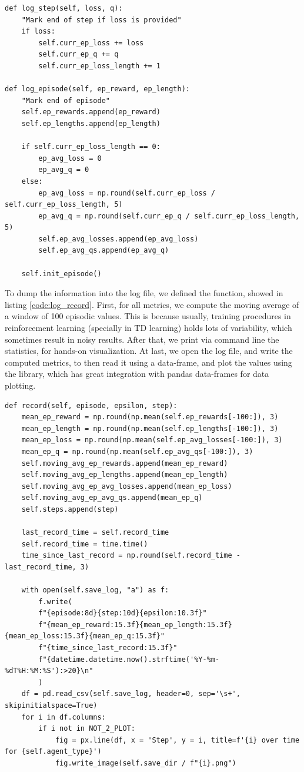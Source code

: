 \begin{lstlisting}[caption={Step and episode functions for metrics extraction}, label={code:log_step_ep}]
def log_step(self, loss, q):
	"Mark end of step if loss is provided"
	if loss:
		self.curr_ep_loss += loss
		self.curr_ep_q += q
		self.curr_ep_loss_length += 1
	
def log_episode(self, ep_reward, ep_length):
	"Mark end of episode"
	self.ep_rewards.append(ep_reward)
	self.ep_lengths.append(ep_length)
	
	if self.curr_ep_loss_length == 0:
		ep_avg_loss = 0
		ep_avg_q = 0
	else:
		ep_avg_loss = np.round(self.curr_ep_loss / self.curr_ep_loss_length, 5)
		ep_avg_q = np.round(self.curr_ep_q / self.curr_ep_loss_length, 5)
		self.ep_avg_losses.append(ep_avg_loss)
		self.ep_avg_qs.append(ep_avg_q)
	
	self.init_episode()
\end{lstlisting}

To dump the information into the log file, we defined the  function, showed in listing \ref{code:log_record}. First, for all metrics, we compute the moving average of a window of 100 episodic values. This is because usually, training procedures in reinforcement learning (specially in TD learning) holds lots of variability, which sometimes result in noisy results. After that, we print via command line the statistics, for hands-on visualization. At last, we open the log file, and write the computed metrics, to then read it using a  data-frame, and plot the values using the  library, which has great integration with pandas data-frames for data plotting.

\begin{lstlisting}[caption={Record function, that saves the moving average statistics in the log file and plots the values of the statistics over the time-steps of the learning}, label={code:log_record}]
def record(self, episode, epsilon, step):
	mean_ep_reward = np.round(np.mean(self.ep_rewards[-100:]), 3)
	mean_ep_length = np.round(np.mean(self.ep_lengths[-100:]), 3)
	mean_ep_loss = np.round(np.mean(self.ep_avg_losses[-100:]), 3)
	mean_ep_q = np.round(np.mean(self.ep_avg_qs[-100:]), 3)
	self.moving_avg_ep_rewards.append(mean_ep_reward)
	self.moving_avg_ep_lengths.append(mean_ep_length)
	self.moving_avg_ep_avg_losses.append(mean_ep_loss)
	self.moving_avg_ep_avg_qs.append(mean_ep_q)
	self.steps.append(step)
	
	last_record_time = self.record_time
	self.record_time = time.time()
	time_since_last_record = np.round(self.record_time - last_record_time, 3)
	
	with open(self.save_log, "a") as f:
		f.write(
		f"{episode:8d}{step:10d}{epsilon:10.3f}"
		f"{mean_ep_reward:15.3f}{mean_ep_length:15.3f}{mean_ep_loss:15.3f}{mean_ep_q:15.3f}"
		f"{time_since_last_record:15.3f}"
		f"{datetime.datetime.now().strftime('%Y-%m-%dT%H:%M:%S'):>20}\n"
		)
	df = pd.read_csv(self.save_log, header=0, sep='\s+', skipinitialspace=True)
	for i in df.columns:
		if i not in NOT_2_PLOT:
			fig = px.line(df, x = 'Step', y = i, title=f'{i} over time for {self.agent_type}')
			fig.write_image(self.save_dir / f"{i}.png")
\end{lstlisting} 

